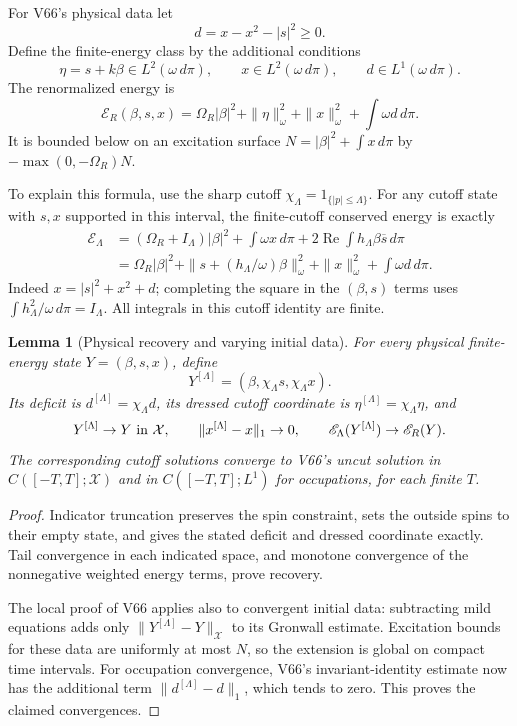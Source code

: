 \documentclass[11pt]{article}
\newtheorem{lemma}[theorem]{Lemma}
\theoremstyle{remark}
\begin{document}
For V66's physical data let
\[
 d=x-x^2-|s|^2\geq0 .
\]
Define the finite-energy class by the additional conditions
\[
 \eta=s+k\beta\in L^2(\omega\,d\pi),\qquad
 x\in L^2(\omega\,d\pi),\qquad
 d\in L^1(\omega\,d\pi).
\]
The renormalized energy is
\[
 \mathscr E_R(\beta,s,x)=
    \Omega_R|\beta|^2+\|\eta\|_\omega^2+
                             \|x\|_\omega^2+\int\omega d\,d\pi.
\]
It is bounded below on an excitation surface
\(N=|\beta|^2+\int x\,d\pi\) by
\(-\max(0,-\Omega_R)N\).

To explain this formula, use the sharp cutoff
\(\chi_\Lambda=1_{\{|p|\leq\Lambda\}}\).
For any cutoff state with \(s,x\) supported in this interval,
the finite-cutoff conserved energy is exactly
\[
 \begin{split}
 \mathscr E_\Lambda
 &= (\Omega_R+I_\Lambda)|\beta|^2+
             \int\omega x\,d\pi+
                      2\operatorname{Re}\int h_\Lambda\beta\overline s\,d\pi\\
 &=\Omega_R|\beta|^2+
       \|s+(h_\Lambda/\omega)\beta\|_\omega^2+
                           \|x\|_\omega^2+\int\omega d\,d\pi .
 \end{split}
\]
Indeed \(x=|s|^2+x^2+d\); completing the square in
the \((\beta,s)\) terms uses
\(\int h_\Lambda^2/\omega\,d\pi=I_\Lambda\).
All integrals in this cutoff identity are finite.

\begin{lemma}[Physical recovery and varying initial data]
\label{lem:v20v67-recovery}
For every physical finite-energy state \(Y=(\beta,s,x)\),
define
\[
 Y^{[\Lambda]}=(\beta,\chi_\Lambda s,\chi_\Lambda x).
\]
Its deficit is \(d^{[\Lambda]}=\chi_\Lambda d\), its
dressed cutoff coordinate is
\(\eta^{[\Lambda]}=\chi_\Lambda\eta\), and
\[
 Y^{[\Lambda]}\to Y\ \hbox{in }\mathcal X,\qquad
 \|x^{[\Lambda]}-x\|_1\to0,\qquad
 \mathscr E_\Lambda(Y^{[\Lambda]})\to\mathscr E_R(Y).
\]
The corresponding cutoff solutions converge to V66's
uncut solution in \(C([-T,T];\mathcal X)\) and in
\(C([-T,T];L^1)\) for occupations, for each finite \(T\).
\end{lemma}
\begin{proof}
Indicator truncation preserves the spin constraint,
sets the outside spins to their empty state, and gives
the stated deficit and dressed coordinate exactly.
Tail convergence in each indicated space, and monotone
convergence of the nonnegative weighted energy terms,
prove recovery.

The local proof of V66 applies also to convergent initial
data: subtracting mild equations adds only
\(\|Y^{[\Lambda]}-Y\|_{\mathcal X}\) to its Gronwall
estimate.  Excitation bounds for these data are uniformly
at most \(N\), so the extension is global on compact
time intervals.  For occupation convergence, V66's
invariant-identity estimate now has the additional
term \(\|d^{[\Lambda]}-d\|_1\), which tends to zero.
This proves the claimed convergences.
\end{proof}
\end{document}
